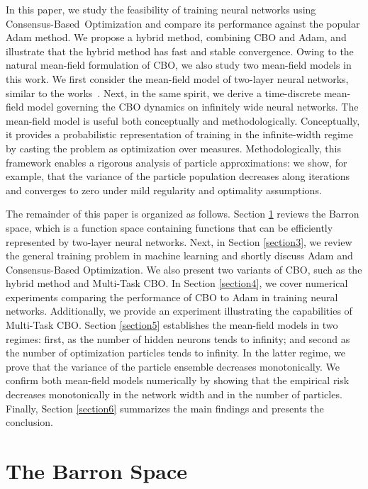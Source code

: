 \documentclass[a4paper, 11pt]{article}
\theoremstyle{plain} %
\begin{document}
	In this paper, we study the feasibility of training neural networks using \mbox{Consensus-Based Optimization} and compare its performance against the popular Adam method. We propose a hybrid method, combining CBO and Adam, and illustrate that the hybrid method has fast and stable convergence. Owing to the natural mean-field formulation of CBO, we also study two mean-field models in this work. We first consider the mean-field model of two-layer neural networks, similar to the works~\cite{mei2018,nguyen2023,sirignano2020,sirignano2020a,bach2022, Chizat2022MeanField}. Next, in the same spirit, we derive a time-discrete mean-field model governing the CBO dynamics on infinitely wide neural networks. The mean-field model is useful both conceptually and methodologically. Conceptually, it provides a probabilistic representation of training in the infinite-width regime by casting the problem as optimization over measures. Methodologically, this framework enables a rigorous analysis of particle approximations: we show, for example, that the variance of the particle population decreases along iterations and converges to zero under mild regularity and optimality assumptions.

	The remainder of this paper is organized as follows. Section \ref{section2} reviews the Barron space, which is a function space containing functions that can be efficiently represented by two-layer neural networks. Next, in Section \ref{section3}, we review the general training problem in machine learning and shortly discuss Adam and Consensus-Based Optimization. We also present two variants of CBO, such as the hybrid method and Multi-Task CBO. In Section \ref{section4}, we cover numerical experiments comparing the performance of CBO to Adam in training neural networks. Additionally, we provide an experiment illustrating the capabilities of Multi-Task CBO. Section \ref{section5} establishes the mean-field models in two regimes: first, as the number of hidden neurons tends to infinity; and second as the number of optimization particles tends to infinity. In the latter regime, we prove that the variance of the particle ensemble decreases 
	monotonically. We confirm both mean-field models numerically by showing that the empirical risk decreases monotonically in the network width and in the number of particles. Finally, Section \ref{section6} summarizes the main findings and presents the conclusion.
	
	\section{The Barron Space}\label{section2}
	
\end{document}
